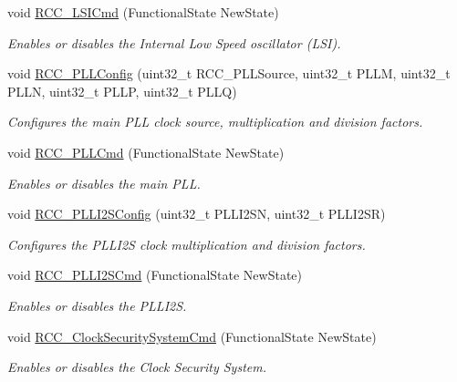 \begin{DoxyCompactItemize}
void \hyperlink{group___r_c_c_ga81e3ca29fd154ac2019bba6936d6d5ed}{R\+C\+C\+\_\+\+L\+S\+I\+Cmd} (Functional\+State New\+State)
\begin{DoxyCompactList}\small\item\em Enables or disables the Internal Low Speed oscillator (L\+SI). \end{DoxyCompactList}\item 
void \hyperlink{group___r_c_c_ga154b93e90bfdede2a874244a1ff1002e}{R\+C\+C\+\_\+\+P\+L\+L\+Config} (uint32\+\_\+t R\+C\+C\+\_\+\+P\+L\+L\+Source, uint32\+\_\+t P\+L\+LM, uint32\+\_\+t P\+L\+LN, uint32\+\_\+t P\+L\+LP, uint32\+\_\+t P\+L\+LQ)
\begin{DoxyCompactList}\small\item\em Configures the main P\+LL clock source, multiplication and division factors. \end{DoxyCompactList}\item 
void \hyperlink{group___r_c_c_ga84dee53c75e58fdb53571716593c2272}{R\+C\+C\+\_\+\+P\+L\+L\+Cmd} (Functional\+State New\+State)
\begin{DoxyCompactList}\small\item\em Enables or disables the main P\+LL. \end{DoxyCompactList}\item 
void \hyperlink{group___r_c_c_ga4c15157382939a693c15620a4867e6ad}{R\+C\+C\+\_\+\+P\+L\+L\+I2\+S\+Config} (uint32\+\_\+t P\+L\+L\+I2\+SN, uint32\+\_\+t P\+L\+L\+I2\+SR)
\begin{DoxyCompactList}\small\item\em Configures the P\+L\+L\+I2S clock multiplication and division factors. \end{DoxyCompactList}\item 
void \hyperlink{group___r_c_c_ga2efe493a6337d5e0034bfcdfb0f541e4}{R\+C\+C\+\_\+\+P\+L\+L\+I2\+S\+Cmd} (Functional\+State New\+State)
\begin{DoxyCompactList}\small\item\em Enables or disables the P\+L\+L\+I2S. \end{DoxyCompactList}\item 
void \hyperlink{group___r_c_c_ga0ff1fd7b9a8a49cdda11b7d7261c3494}{R\+C\+C\+\_\+\+Clock\+Security\+System\+Cmd} (Functional\+State New\+State)
\begin{DoxyCompactList}\small\item\em Enables or disables the Clock Security System. \end{DoxyCompactList}\item 

\end{DoxyCompactItemize}
